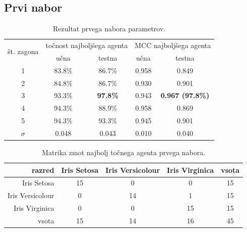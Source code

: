 \subsection{Prvi nabor}\label{subsec:dodatek-iris-prvi-nabor}
\begin{table}[H]
    \begin{center}
        \begin{tabular}{|| c | c c || c c ||}
            \hline
            \multirow{2}{*}{št. zagona} & \multicolumn{2}{c||}{točnost najboljšega agenta} & \multicolumn{2}{c||}{MCC najboljšega agenta} \\ \cline{2-5}
            & učna   & testna          & učna  & testna                  \\
            \hline
            1        & 83.8\% & 86.7\%          & 0.958 & 0.849                   \\
            \hline
            2        & 84.8\% & 86.7\%          & 0.930 & 0.901                   \\
            \hline
            3        & 93.3\% & \textbf{97.8\%} & 0.943 & \textbf{0.967 (97.8\%)} \\
            \hline
            4        & 94.3\% & 88.9\%          & 0.958 & 0.869                   \\
            \hline
            5        & 94.3\% & 93.3\%          & 0.945 & 0.901                   \\
            \hline
            $\sigma$ & 0.048  & 0.043           & 0.010 & 0.040                   \\
            \hline
        \end{tabular}
    \end{center}
    \caption{Rezultat prvega nabora parametrov.}
    \label{tab:iris_result_1}
\end{table}

\begin{table}[H]
    \centering
    \begin{tabular}{||rcccc||}
        \hline
        razred           & Iris Setosa & Iris Versicolour & Iris Virginica & vsota \\ \hline
        Iris Setosa      & 15          & 0                & 0              & 15    \\ \hline
        Iris Versicolour & 0           & 14               & 1              & 15    \\ \hline
        Iris Virginica   & 0           & 0                & 15             & 15    \\ \hline
        vsota            & 15          & 14               & 16             & 45    \\ \hline
    \end{tabular}
    \caption{Matrika zmot najbolj točnega agenta prvega nabora.}
    \label{tab:iris_acc_1}
\end{table}

